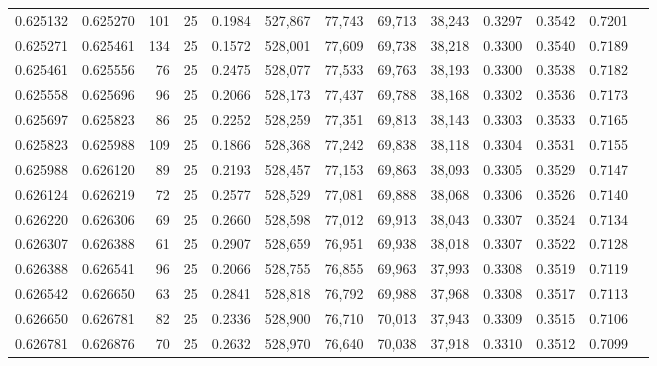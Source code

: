 \begin{tabular}{rrrrrrrrrrrrr}
0.625132 & 0.625270 &   101 &  25 &                                     0.1984 & 527,867 &  77,743 &  69,713 &  38,243 & 0.3297 & 0.3542 & 0.7201 \\
0.625271 & 0.625461 &   134 &  25 &                                     0.1572 & 528,001 &  77,609 &  69,738 &  38,218 & 0.3300 & 0.3540 & 0.7189 \\
0.625461 & 0.625556 &    76 &  25 &                                     0.2475 & 528,077 &  77,533 &  69,763 &  38,193 & 0.3300 & 0.3538 & 0.7182 \\
0.625558 & 0.625696 &    96 &  25 &                                     0.2066 & 528,173 &  77,437 &  69,788 &  38,168 & 0.3302 & 0.3536 & 0.7173 \\
0.625697 & 0.625823 &    86 &  25 &                                     0.2252 & 528,259 &  77,351 &  69,813 &  38,143 & 0.3303 & 0.3533 & 0.7165 \\
0.625823 & 0.625988 &   109 &  25 &                                     0.1866 & 528,368 &  77,242 &  69,838 &  38,118 & 0.3304 & 0.3531 & 0.7155 \\
0.625988 & 0.626120 &    89 &  25 &                                     0.2193 & 528,457 &  77,153 &  69,863 &  38,093 & 0.3305 & 0.3529 & 0.7147 \\
0.626124 & 0.626219 &    72 &  25 &                                     0.2577 & 528,529 &  77,081 &  69,888 &  38,068 & 0.3306 & 0.3526 & 0.7140 \\
0.626220 & 0.626306 &    69 &  25 &                                     0.2660 & 528,598 &  77,012 &  69,913 &  38,043 & 0.3307 & 0.3524 & 0.7134 \\
0.626307 & 0.626388 &    61 &  25 &                                     0.2907 & 528,659 &  76,951 &  69,938 &  38,018 & 0.3307 & 0.3522 & 0.7128 \\
0.626388 & 0.626541 &    96 &  25 &                                     0.2066 & 528,755 &  76,855 &  69,963 &  37,993 & 0.3308 & 0.3519 & 0.7119 \\
0.626542 & 0.626650 &    63 &  25 &                                     0.2841 & 528,818 &  76,792 &  69,988 &  37,968 & 0.3308 & 0.3517 & 0.7113 \\
0.626650 & 0.626781 &    82 &  25 &                                     0.2336 & 528,900 &  76,710 &  70,013 &  37,943 & 0.3309 & 0.3515 & 0.7106 \\
0.626781 & 0.626876 &    70 &  25 &                                     0.2632 & 528,970 &  76,640 &  70,038 &  37,918 & 0.3310 & 0.3512 & 0.7099 \\

\end{tabular}
